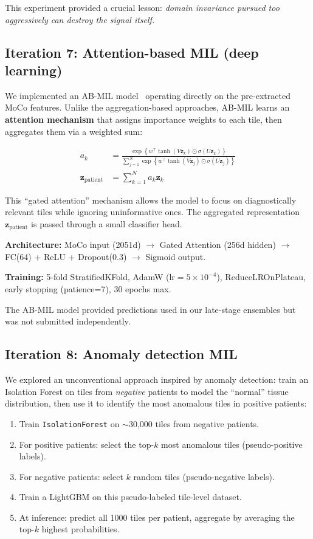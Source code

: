 \documentclass[11pt,a4paper]{article}
\begin{document}
This experiment provided a crucial lesson: \emph{domain invariance pursued too aggressively can destroy the signal itself.}

\subsection{Iteration 7: Attention-based MIL (deep learning)}
\label{sec:abmil}

We implemented an AB-MIL model~\citep{ilse2018attention} operating directly on the pre-extracted MoCo features. Unlike the aggregation-based approaches, AB-MIL learns an \textbf{attention mechanism} that assigns importance weights to each tile, then aggregates them via a weighted sum:

\begin{align}
    a_k &= \frac{\exp\left\{w^\top \tanh(V \mathbf{z}_k) \odot \sigma(U \mathbf{z}_k)\right\}}{\sum_{j=1}^{N} \exp\left\{w^\top \tanh(V \mathbf{z}_j) \odot \sigma(U \mathbf{z}_j)\right\}} \\
    \mathbf{z}_{\text{patient}} &= \sum_{k=1}^{N} a_k \mathbf{z}_k
\end{align}

This ``gated attention'' mechanism allows the model to focus on diagnostically relevant tiles while ignoring uninformative ones. The aggregated representation $\mathbf{z}_{\text{patient}}$ is passed through a small classifier head.

\textbf{Architecture:} MoCo input (2051d) $\rightarrow$ Gated Attention (256d hidden) $\rightarrow$ FC(64) + ReLU + Dropout(0.3) $\rightarrow$ Sigmoid output.

\textbf{Training:} 5-fold StratifiedKFold, AdamW ($\text{lr}=5 \times 10^{-4}$), ReduceLROnPlateau, early stopping (patience=7), 30 epochs max.

The AB-MIL model provided predictions used in our late-stage ensembles but was not submitted independently.

\subsection{Iteration 8: Anomaly detection MIL}

We explored an unconventional approach inspired by anomaly detection: train an Isolation Forest on tiles from \emph{negative} patients to model the ``normal'' tissue distribution, then use it to identify the most anomalous tiles in positive patients:

\begin{enumerate}[nosep]
    \item Train \texttt{IsolationForest} on $\sim$30,000 tiles from negative patients.
    \item For positive patients: select the top-$k$ most anomalous tiles (pseudo-positive labels).
    \item For negative patients: select $k$ random tiles (pseudo-negative labels).
    \item Train a LightGBM on this pseudo-labeled tile-level dataset.
    \item At inference: predict all 1000 tiles per patient, aggregate by averaging the top-$k$ highest probabilities.
\end{enumerate}
\end{document}
